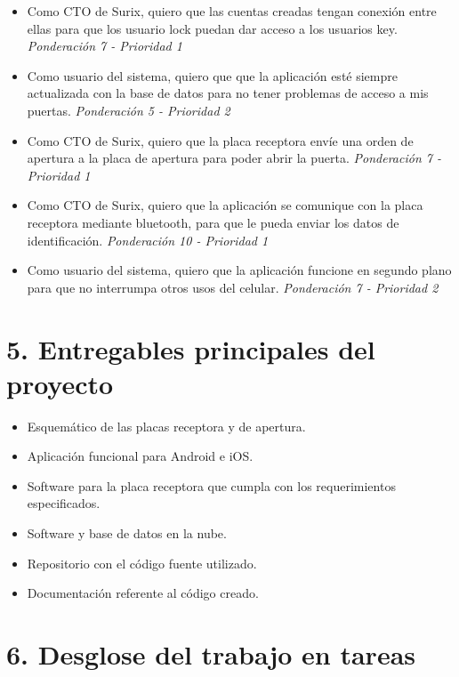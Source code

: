 \documentclass[11pt]{charter}
\begin{document}
\begin{itemize}
\item Como CTO de Surix, quiero que las cuentas creadas tengan conexión entre ellas para que los usuario lock puedan dar acceso a los usuarios key.\textit{ Ponderación 7 - Prioridad 1}
\item Como usuario del sistema, quiero que que la aplicación esté siempre actualizada con la base de datos para no tener problemas de acceso a mis puertas.\textit{ Ponderación 5 - Prioridad 2}
\item Como CTO de Surix, quiero que la placa receptora envíe una orden de apertura a la placa de apertura para poder abrir la puerta.\textit{ Ponderación 7 - Prioridad 1}
\item Como CTO de Surix, quiero que la aplicación se comunique con la placa receptora mediante bluetooth, para que le pueda enviar los datos de identificación.\textit{ Ponderación 10 - Prioridad 1}
\item Como usuario del sistema, quiero que la aplicación funcione en segundo plano para que no interrumpa otros usos del celular.\textit{ Ponderación 7 - Prioridad 2}


\end{itemize}

\section{5. Entregables principales del proyecto}
\label{sec:entregables}

\begin{itemize}
\item Esquemático de las placas receptora y de apertura.
\item Aplicación funcional para Android e iOS.
\item Software para la placa receptora que cumpla con los requerimientos especificados.
\item Software y base de datos en la nube.
\item Repositorio con el código fuente utilizado.
\item Documentación referente al código creado.

\end{itemize}


\section{6. Desglose del trabajo en tareas}
\label{sec:wbs}
\end{document}
